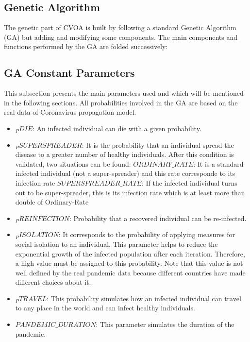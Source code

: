 \documentclass[letterpaper]{article}%
\begin{document}
\subsection{Genetic Algorithm}
	The genetic part of CVOA is built by following a standard Genetic Algorithm (GA) but adding and modifying some components.
The main components and functions performed by the GA are folded successively:

\subsection{GA Constant Parameters}
This subsection presents the main parameters used and which will be mentioned in the following sections.
All probabilities involved in the GA are based on the real data of Coronavirus propagation model.
\begin{itemize}
\item $_PDIE$: An infected individual can die with a given probability.
\item $_PSUPERSPREADER$: It is the probability that an individual spread the disease to a greater number of healthy individuals. After this condition is validated, two situations can be found: %
\subitem $ORDINARY\_RATE$: It is a standard infected individual (not a super-spreader) and this rate corresponde to its infection rate
\subitem $SUPERSPREADER\_RATE$: If the infected individual turns out to be super-spreader, this is its infection rate which is at least more than double of Ordinary-Rate
\item $_PREINFECTION$: Probability that a recovered individual can be re-infected.
\item $_PISOLATION$: It corresponds to the probability of applying measures for social isolation to an individual. This parameter helps to reduce the exponential growth of the infected population after each iteration. Therefore, a high value must be assigned to this probability. Note that this value is not well defined by the real pandemic data because different countries have made different choices about it. 
\item $_PTRAVEL$: This probability simulates how an infected individual can travel to any place in the world and can infect healthy individuals.
\item $PANDEMIC\_DURATION$: This parameter simulates the duration of the pandemic.
\end{itemize}
\end{document}
